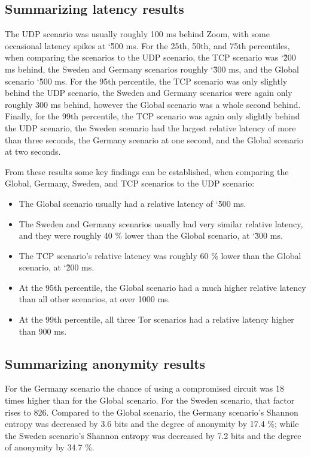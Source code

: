 \documentclass{kththesis}
\begin{document}
\subsection{Summarizing latency results}
The UDP scenario was usually roughly 100 ms behind Zoom, with some occasional latency spikes at \char`\~500 ms. For the 25th, 50th, and 75th percentiles, when comparing the scenarios to the UDP scenario, the TCP scenario was \char`\~200 ms behind, the Sweden and Germany scenarios roughly \char`\~300 ms, and the Global scenario \char`\~500 ms. For the 95th percentile, the TCP scenario was only slightly behind the UDP scenario, the Sweden and Germany scenarios were again only roughly 300 ms behind, however the Global scenario was a whole second behind. Finally, for the 99th percentile, the TCP scenario was again only slightly behind the UDP scenario, the Sweden scenario had the largest relative latency of more than three seconds, the Germany scenario at one second, and the Global scenario at two seconds.

\break
\noindent From these results some key findings can be established, when comparing the Global, Germany, Sweden, and TCP scenarios to the UDP scenario:

\begin{itemize}
  \vspace{-0.2cm}\item The Global scenario usually had a relative latency of \char`\~500 ms.
  \vspace{-0.2cm}\item The Sweden and Germany scenarios usually had very similar relative latency, and they were roughly 40 \% lower than the Global scenario, at \char`\~300 ms.
  \vspace{-0.2cm}\item The TCP scenario's relative latency was roughly 60 \% lower than the Global scenario, at \char`\~200 ms.
  \vspace{-0.2cm}\item At the 95th percentile, the Global scenario had a much higher relative latency than all other scenarios, at over 1000 ms.
  \vspace{-0.2cm}\item At the 99th percentile, all three Tor scenarios had a relative latency higher than 900 ms.
\end{itemize}

\subsection{Summarizing anonymity results}
For the Germany scenario the chance of using a compromised circuit was 18 times higher than for the Global scenario. For the Sweden scenario, that factor rises to 826. Compared to the Global scenario, the Germany scenario's Shannon entropy was decreased by 3.6 bits and the degree of anonymity by 17.4 \%; while the Sweden scenario's Shannon entropy was decreased by 7.2 bits and the degree of anonymity by 34.7 \%.
\end{document}
